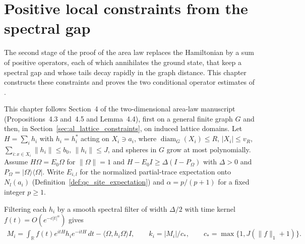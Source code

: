 
\chapter{Positive local constraints from the spectral gap}%
\label{ch:peps_area_law_constraints}

The second stage of the proof of the area law replaces the Hamiltonian by a
sum of positive operators, each of which annihilates the ground state, that
keep a spectral gap and whose tails decay rapidly in the graph distance. This
chapter constructs these constraints and proves the two conditional operator
estimates of \cite[Section~5]{OpenAI2026AreaLaw}.

This chapter follows Section~4 of the two-dimensional area-law manuscript
(Propositions~4.3 and~4.5 and Lemma~4.4), first on a general finite graph $G$
and then, in Section~\ref{sec:al_lattice_constraints}, on induced lattice
domains. Let $H=\sum_i h_i$ with $h_i=h_i^*$ acting on $X_i\ni a_i$, where
$\operatorname{diam}_G(X_i)\le R$, $|X_i|\le v_R$,
$\sum_{i:x\in X_i}\|h_i\|\le b_0$, $\|h_i\|\le J$, and spheres in $G$ grow at
most polynomially. Assume $H\Omega=E_0\Omega$ for $\|\Omega\|=1$ and
$H-E_0I\ge\Delta(I-P_\Omega)$ with $\Delta>0$ and
$P_\Omega=|\Omega\rangle\langle\Omega|$. Write $E_{i,l}$ for the normalized
partial-trace expectation onto $N_l(a_i)$
(Definition~\ref{def:qc_site_expectation}) and $\alpha=p/(p+1)$ for a fixed
integer $p\ge1$.

Filtering each $h_i$ by a smooth spectral filter of width $\Delta/2$ with time
kernel $f(t)=O(e^{-c|t|^\alpha})$ gives
\begin{align}
    M_i=\int_{\mathbb R}f(t)e^{itH}h_ie^{-itH}\,dt-\langle\Omega,h_i\Omega\rangle I,
    \qquad k_i=|M_i|/c_*,\qquad c_*=\max\{1,J(\|f\|_1+1)\}.
    \label{eq:al_filtered_constraint}
\end{align}




